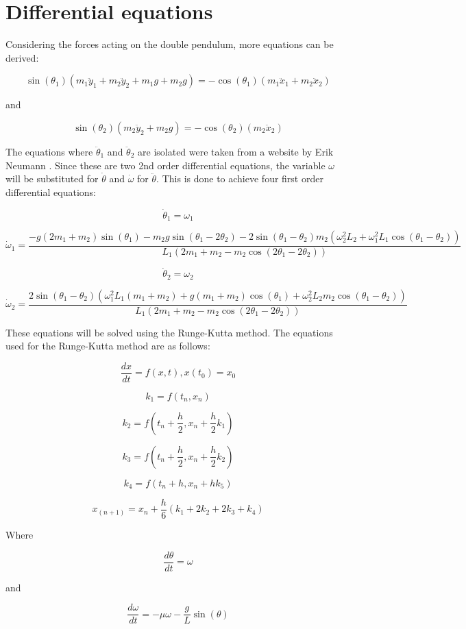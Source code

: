 \documentclass[linenumbers,RNAAS,trackchanges]{aastex631}
\begin{document}
\section{Differential equations} \label{sec:method}

Considering the forces acting on the double pendulum, more equations can be derived:


$$\sin(\theta_1) (m_1\ddot y_1 + m_2 \ddot y_2 + m_1 g + m_2 g) = -\cos(\theta_1)(m_1 \ddot x_1 + m_2 \ddot x_2)$$ 

and 

$$\sin(\theta_2) (m_2 \ddot y_2 + m_2 g) = -\cos(\theta_2) (m_2 \ddot x_2)$$

The equations where $\ddot\theta_1$ and $\ddot\theta_2$ are isolated were taken from a website by Erik Neumann \cite{neumann}. Since these are two 2nd order differential equations, the variable $\omega$ will be substituted for $\dot\theta$ and $\dot\omega$ for $\ddot\theta$. This is done to achieve four first order differential equations:

$$\dot\theta_1 = \omega_1$$

$$\dot\omega_1 = \frac{-g (2m_1 + m_2) \sin(\theta_1) - m_2 g \sin(\theta_1 - 2\theta_2) - 2\sin(\theta_1 - \theta_2) m_2 (\omega_2^2 L_2 + \omega_1^2 L_1 \cos(\theta_1 - \theta_2))}{L_1 (2m_1 + m_2 - m_2 \cos(2\theta_1 - 2\theta_2))}$$

$$\dot\theta_2 = \omega_2$$

$$\dot\omega_2 = \frac{2\sin(\theta_1 - \theta_2)(\omega_1^2 L_1 (m_1 + m_2) + g(m_1 + m_2) \cos(\theta_1) + \omega_2^2 L_2 m_2 \cos(\theta_1 - \theta_2))}{L_1 (2m_1 + m_2 - m_2 \cos(2\theta_1 - 2\theta_2))}$$


These equations will be solved using the Runge-Kutta method. The equations used for the Runge-Kutta method are as follows:

$$\frac{dx}{dt} = f(x,t), x(t_0) = x_0$$

$$k_1 = f(t_n, x_n)$$

$$k_2 = f(t_n + \frac{h}{2}, x_n + \frac{h}{2}k_1)$$

$$k_3 = f(t_n + \frac{h}{2}, x_n + \frac{h}{2}k_2)$$

$$k_4 = f(t_n + h, x_n + h k_5)$$

$$x_{(n+1)} = x_n + \frac{h}{6}(k_1 + 2k_2 + 2k_3 + k_4)$$

Where 

$$\frac{d\theta}{dt} = \omega$$

and

$$\frac{d\omega}{dt} = -\mu\omega - \frac{g}{L}\sin(\theta)$$
\end{document}
